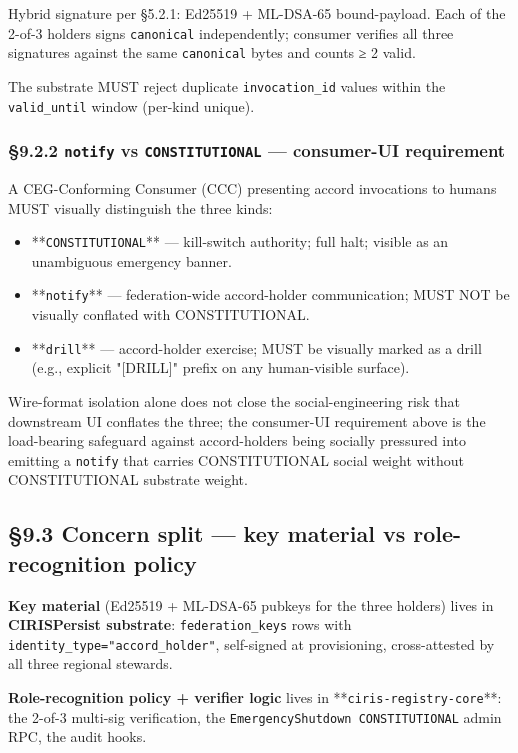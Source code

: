 \documentclass[10pt]{article}
\begin{document}
Hybrid signature per §5.2.1: Ed25519 + ML-DSA-65 bound-payload. Each of the 2-of-3 holders signs \texttt{canonical} independently; consumer verifies all three signatures against the same \texttt{canonical} bytes and counts ≥ 2 valid.


The substrate MUST reject duplicate \texttt{invocation\_id} values within the \texttt{valid\_until} window (per-kind unique).


\subsubsection*{§9.2.2 \texttt{notify} vs \texttt{CONSTITUTIONAL} — consumer-UI requirement}


A CEG-Conforming Consumer (CCC) presenting accord invocations to humans MUST visually distinguish the three kinds:


\begin{itemize}\setlength\itemsep{0pt}
\item **\texttt{CONSTITUTIONAL}** — kill-switch authority; full halt; visible as an unambiguous emergency banner.
\item **\texttt{notify}** — federation-wide accord-holder communication; MUST NOT be visually conflated with CONSTITUTIONAL.
\item **\texttt{drill}** — accord-holder exercise; MUST be visually marked as a drill (e.g., explicit "[DRILL]" prefix on any human-visible surface).
\end{itemize}


Wire-format isolation alone does not close the social-engineering risk that downstream UI conflates the three; the consumer-UI requirement above is the load-bearing safeguard against accord-holders being socially pressured into emitting a \texttt{notify} that carries CONSTITUTIONAL social weight without CONSTITUTIONAL substrate weight.


\subsection*{§9.3 Concern split — key material vs role-recognition policy}


\textbf{Key material} (Ed25519 + ML-DSA-65 pubkeys for the three holders) lives in \textbf{CIRISPersist substrate}: \texttt{federation\_keys} rows with \texttt{identity\_type="accord\_holder"}, self-signed at provisioning, cross-attested by all three regional stewards.


\textbf{Role-recognition policy + verifier logic} lives in **\texttt{ciris-registry-core}**: the 2-of-3 multi-sig verification, the \texttt{EmergencyShutdown CONSTITUTIONAL} admin RPC, the audit hooks.
\end{document}
